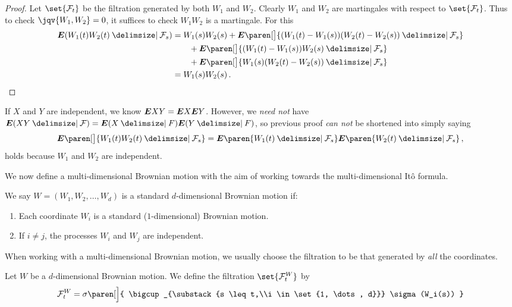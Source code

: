 \begin{proof}
  Let $\set{\mathcal F_t}$ be the filtration generated by both $W_1$ and $W_2$.
  Clearly $W_1$ and $W_2$ are martingales with respect to $\set{\mathcal F_t}$.
  Thus to check $\jqv{W_1,W_2} = 0$, it suffices to check $W_1 W_2$ is a martingale.
  For this
  \begin{align*}
    \E( W_1(t) W_2(t) \given \mathcal F_s )
      &= W_1(s) W_2(s)
	+ \E \paren[\big]{ (W_1(t) - W_1(s)) (W_2(t) - W_2(s)) \given \mathcal F_s }
    \\
	&\qquad+ \E \paren[\big]{ (W_1(t) - W_1(s)) W_2(s)  \given \mathcal F_s }
    \\
	&\qquad+ \E \paren[\big]{ W_1(s) (W_2(t) - W_2(s)) \given \mathcal F_s }
    \\
      &= W_1(s) W_2(s)\,.
      \qedhere
  \end{align*}
\end{proof}
\begin{remark}
  If $X$ and $Y$ are independent, we know $\bm{E} XY = \bm{E} X \bm{E} Y$.
  However, we \emph{need not} have $\E (XY \given \mathcal F) = \E(X \given F) \E (Y \given F)$, so previous proof \emph{can not} be shortened into simply saying
  \begin{equation*}
    \E \paren[\big]{ W_1(t) W_2(t) \given \mathcal F_s }
      = \E \paren{ W_1(t) \given \mathcal F_s }
	  \E \paren{ W_2(t) \given \mathcal F_s }\,,
  \end{equation*}
  holds because $W_1$ and $W_2$ are independent.
\end{remark}

We now define a multi-dimensional Brownian motion with the aim of working towards the multi-dimensional It\^o formula.
\begin{definition}
  We say $W = (W_1, W_2, \dots, W_d)$ is a standard $d$-dimensional Brownian motion if:
  \begin{enumerate}
    \item
      Each coordinate $W_i$ is a standard ($1$-dimensional) Brownian motion.
    \item
      If $i \neq j$, the processes $W_i$ and $W_j$ are independent.
  \end{enumerate}
\end{definition}

When working with a multi-dimensional Brownian motion, we usually choose the filtration to be that generated by \emph{all} the coordinates.

\begin{definition}
  Let $W$ be a $d$-dimensional Brownian motion.
  We define the filtration $\set{\mathcal F_t^W}$ by
  \begin{equation*}
    \mathcal F_t^W = \sigma\paren[\Big]{ \bigcup_{\substack{s \leq t,\\i \in \set{1, \dots, d}}} \sigma(W_i(s)) }
  \end{equation*}
\end{definition}

